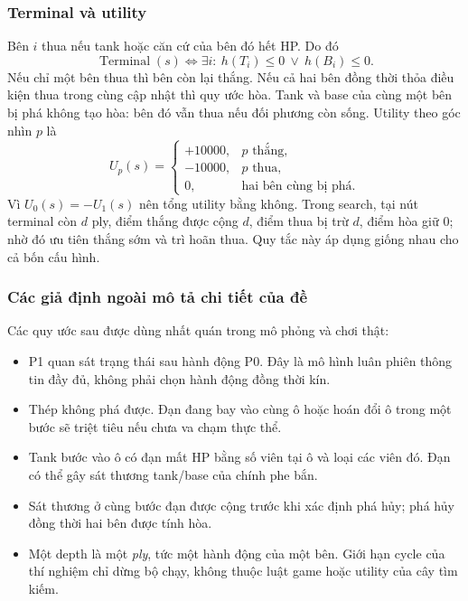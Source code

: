 \subsubsection{Terminal và utility}
Bên $i$ thua nếu tank hoặc căn cứ của bên đó hết HP. Do đó
\begin{equation}
\operatorname{Terminal}(s)\iff
\exists i:\ h(T_i)\leq0\ \lor\ h(B_i)\leq0.
\end{equation}
Nếu chỉ một bên thua thì bên còn lại thắng. Nếu cả hai bên đồng thời
thỏa điều kiện thua trong cùng cập nhật thì quy ước hòa. Tank và base
của cùng một bên bị phá không tạo hòa: bên đó vẫn thua nếu đối phương
còn sống. Utility theo góc nhìn $p$ là
\begin{equation}
U_p(s)=\begin{cases}
+10000,&p\text{ thắng},\\
-10000,&p\text{ thua},\\
0,&\text{hai bên cùng bị phá}.
\end{cases}
\end{equation}
Vì $U_0(s)=-U_1(s)$ nên tổng utility bằng không. Trong search, tại nút
terminal còn $d$ ply, điểm thắng được cộng $d$, điểm thua bị trừ $d$,
điểm hòa giữ 0; nhờ đó ưu tiên thắng sớm và trì hoãn thua. Quy tắc này
áp dụng giống nhau cho cả bốn cấu hình.

\subsubsection{Các giả định ngoài mô tả chi tiết của đề}
Các quy ước sau được dùng nhất quán trong mô phỏng và chơi thật:
\begin{itemize}
\item P1 quan sát trạng thái sau hành động P0. Đây là mô hình luân
phiên thông tin đầy đủ, không phải chọn hành động đồng thời kín.
\item Thép không phá được. Đạn đang bay vào cùng ô hoặc hoán đổi ô
trong một bước sẽ triệt tiêu nếu chưa va chạm thực thể.
\item Tank bước vào ô có đạn mất HP bằng số viên tại ô và loại các
viên đó. Đạn có thể gây sát thương tank/base của chính phe bắn.
\item Sát thương ở cùng bước đạn được cộng trước khi xác định phá hủy;
phá hủy đồng thời hai bên được tính hòa.
\item Một depth là một \emph{ply}, tức một hành động của một bên.
Giới hạn cycle của thí nghiệm chỉ dừng bộ chạy, không thuộc luật game
hoặc utility của cây tìm kiếm.
\end{itemize}

